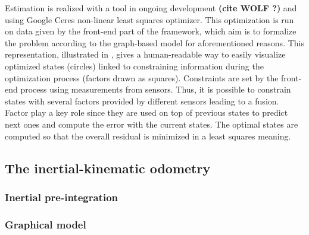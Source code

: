 
Estimation is realized with a tool in ongoing development \textbf{(cite WOLF ?)} and using Google Ceres non-linear least squares optimizer. This optimization is run on data given by the front-end part of the framework,
which aim is to formalize the problem according to the graph-based model for aforementioned reasons. This representation, illustrated in , 
gives a human-readable way to easily visualize optimized states (circles) linked to constraining information during the optimization process (factors drawn as squares). Constraints are set by the front-end process using measurements from sensors.
Thus, it is possible to constrain states with several factors provided by different sensors leading to a fusion. Factor play a key role since they are used on top of previous states to predict next ones and compute the error with the current states.
The optimal states are computed so that the overall residual is minimized in a least squares meaning.

\subsection{The inertial-kinematic odometry}
\subsubsection{Inertial pre-integration}
\subsubsection{Graphical model}

